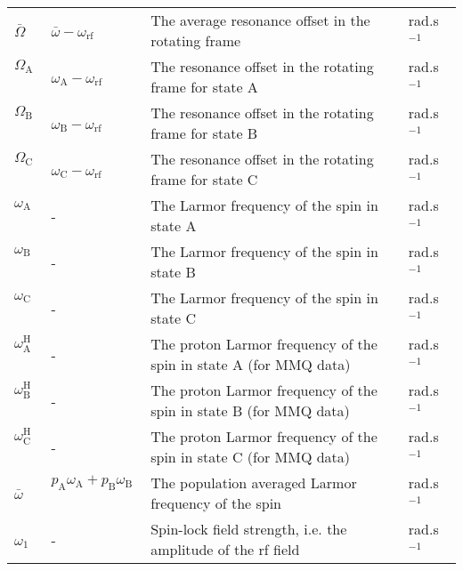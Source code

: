 \documentclass[a4paper,11pt,twoside,openright]{book}
\begin{document}
{\begin{landscape}
\begin{center}
\begin{small}
\begin{longtable}{llll}
$\bar\Omega $\        & $\bar\omega - \omega_\textrm{rf}$\          & The average resonance offset in the rotating frame                            & rad.s$^{-1}$\  \\
$\Omega_\textrm{A}$\          & $\omega_\textrm{A}- \omega_\textrm{rf}$\            & The resonance offset in the rotating frame for state A                        & rad.s$^{-1}$\  \\
$\Omega_\textrm{B}$\          & $\omega_\textrm{B}- \omega_\textrm{rf}$\            & The resonance offset in the rotating frame for state B                        & rad.s$^{-1}$\  \\
$\Omega_\textrm{C}$\          & $\omega_\textrm{C}- \omega_\textrm{rf}$\            & The resonance offset in the rotating frame for state C                        & rad.s$^{-1}$\  \\
$\omega_\textrm{A}$\           & -                              & The Larmor frequency of the spin in state A                                   & rad.s$^{-1}$\  \\
$\omega_\textrm{B}$\           & -                              & The Larmor frequency of the spin in state B                                   & rad.s$^{-1}$\  \\
$\omega_\textrm{C}$\           & -                              & The Larmor frequency of the spin in state C                                   & rad.s$^{-1}$\  \\
$\omega^{\scriptscriptstyle\mathrm{H}}_\textrm{A}$\          & -                              & The proton Larmor frequency of the spin in state A (for MMQ data)             & rad.s$^{-1}$\  \\
$\omega^{\scriptscriptstyle\mathrm{H}}_\textrm{B}$\          & -                              & The proton Larmor frequency of the spin in state B (for MMQ data)             & rad.s$^{-1}$\  \\
$\omega^{\scriptscriptstyle\mathrm{H}}_\textrm{C}$\          & -                              & The proton Larmor frequency of the spin in state C (for MMQ data)             & rad.s$^{-1}$\  \\
$\bar\omega $\         & $p_\textrm{A}\omega_\textrm{A}+ p_\textrm{B}\omega_\textrm{B}$\       & The population averaged Larmor frequency of the spin                          & rad.s$^{-1}$\  \\
$\omega_1 $\         & -                              & Spin-lock field strength, i.e. the amplitude of the rf field                  & rad.s$^{-1}$\  \\

\end{longtable}
\end{small}
\end{center}
\end{landscape}}
\end{document}
